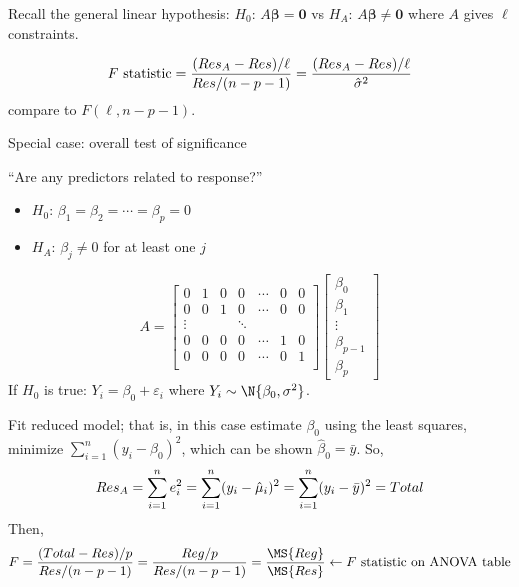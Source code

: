 Recall the general linear hypothesis:
$ H_0 $: $ A\symbf{\beta}=\symbf{0} $
vs $ H_A $: $ A\symbf{\beta}\neq \symbf{0} $
where $ A $ gives $ \ell $ constraints.

\[ F\text{ statistic}=
    \frac{(\relax{Res}_A-\relax{Res})/\ell}{\relax{Res}/(n-p-1)}=
    \frac{(\relax{Res}_A-\relax{Res})/\ell}{\hat{\sigma}^2}  \]
compare to $ F(\ell,n-p-1) $.

Special case: overall test of significance

``Are any predictors related to response?''
\begin{itemize}
    \item $ H_0 $: $ \beta_1=\beta_2=\cdots=\beta_p=0 $
    \item $ H_A $: $ \beta_j\neq 0 $ for at least one $ j $
\end{itemize}
\[ A=\begin{bmatrix}
        0      & 1 & 0 & 0      & \cdots & 0 & 0 \\
        0      & 0 & 1 & 0      & \cdots & 0 & 0 \\
        \vdots &   &   & \ddots                  \\
        0      & 0 & 0 & 0      & \cdots & 1 & 0 \\
        0      & 0 & 0 & 0      & \cdots & 0 & 1 \\
    \end{bmatrix}\begin{bmatrix}
        \beta_0     \\
        \beta_1     \\
        \vdots      \\
        \beta_{p-1} \\
        \beta_p
    \end{bmatrix} \]
If $ H_0 $ is true: $ Y_i=\beta_0+\varepsilon_i $
where $ Y_i \sim \N{\beta_0,\sigma^2} $.

Fit reduced model; that is, in this case estimate $ \beta_0 $
using the least squares, minimize $ \sum_{i=1}^{n} (y_i-\beta_0)^2 $,
which can be shown $ \hat{\beta}_0=\bar{y} $. So,
\[ \relax{Res}_A
    =\sum_{i=1}^{n} e_i^2
    =\sum_{i=1}^{n} (y_i-\hat{\mu}_i)^2
    =\sum_{i=1}^{n}(y_i-\bar{y})^2
    =\relax{Total} \]
Then,
\[ F=\frac{(\SS{Total}-\SS{Res})/p}{\SS{Res}/(n-p-1)}
    =\frac{\SS{Reg}/p}{\SS{Res}/(n-p-1)}
    =\frac{\MS{Reg}}{\MS{Res}}
    \leftarrow F\text{ statistic on ANOVA table}    \]
